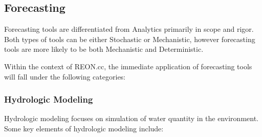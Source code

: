 \documentclass[letterpaper,10pt,english]{sphinxmanual}
\begin{document}
\subsection{Forecasting}
\label{\detokenize{requirements/knowledge/forecasting:forecasting}}\label{\detokenize{requirements/knowledge/forecasting::doc}}
\sphinxAtStartPar
Forecasting tools are differentiated from Analytics primarily in scope and
rigor. Both types of tools can be either Stochastic or Mechanistic, however
forecasting tools are more likely to be both Mechanistic and Deterministic.

\sphinxAtStartPar
Within the context of REON.cc, the immediate application of forecasting tools will fall under the following categories:


\subsubsection{Hydrologic Modeling}
\label{\detokenize{requirements/knowledge/hydrologic:hydrologic-modeling}}\label{\detokenize{requirements/knowledge/hydrologic::doc}}
\sphinxAtStartPar
Hydrologic modeling focuses on simulation of water quantity in the environment. Some key elements of hydrologic modeling include:
\end{document}
